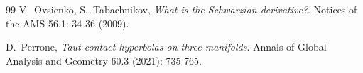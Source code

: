 \documentclass[10pt]{amsart}
\theoremstyle{definition}
\begin{document}
\begin{thebibliography}{99}
 V.~Ovsienko, S.~Tabachnikov,  {\em What is the Schwarzian derivative?}. Notices of the AMS 56.1: 34-36 (2009).

 D.~Perrone, {\em Taut contact hyperbolas on three-manifolds}. Annals of Global Analysis and Geometry 60.3 (2021): 735-765.










\end{thebibliography}
\end{document}
